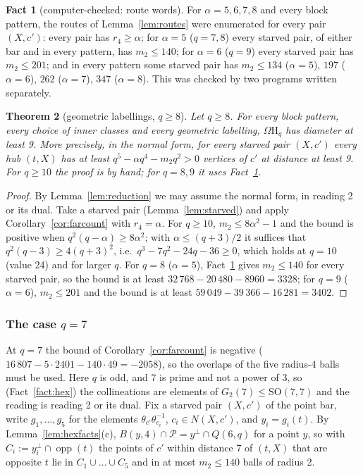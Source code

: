 \documentclass[11pt]{amsart}
\newtheorem{theorem}{Theorem}[section]
\theoremstyle{definition}
\newtheorem{fact}[theorem]{Fact}
\theoremstyle{remark}
\numberwithin{equation}{section}
\newcommand{\opp}{\operatorname{opp}}
\newcommand{\cP}{\mathcal P}
\newcommand{\Om}{\Omega\mathrm H}
\begin{document}
\begin{fact}[computer-checked: route words]\label{fact:C4}
For $\alpha=5,6,7,8$ and every block pattern, the routes of Lemma~\ref{lem:routes} were enumerated for every pair $(X,c')$:
every pair has $r_4\ge\alpha$; for $\alpha=5$ ($q=7,8$) every starved pair, of either bar and in every pattern, has $m_2\le140$;
for $\alpha=6$ ($q=9$) every starved pair has $m_2\le201$; and in every pattern some starved pair has $m_2\le134$
($\alpha=5$), $197$ ($\alpha=6$), $262$ ($\alpha=7$), $347$ ($\alpha=8$). This was checked by two programs written separately.
\end{fact}

\begin{theorem}[geometric labellings, $q\ge8$]\label{thm:geomq8}
Let $q\ge8$. For every block pattern, every choice of inner classes and every geometric labelling, $\Om_q$ has diameter at
least 9. More precisely, in the normal form, for every starved pair $(X,c')$ every hub $(t,X)$ has at least
$q^5-\alpha q^4-m_2q^2>0$ vertices of $c'$ at distance at least 9. For $q\ge10$ the proof is by hand; for $q=8,9$ it uses
Fact~\ref{fact:C4}.
\end{theorem}

\begin{proof}
By Lemma~\ref{lem:reduction} we may assume the normal form, in reading 2 or its dual. Take a starved pair
(Lemma~\ref{lem:starved}) and apply Corollary~\ref{cor:farcount} with $r_4=\alpha$. For $q\ge10$, $m_2\le8\alpha^2-1$ and the
bound is positive when $q^2(q-\alpha)\ge8\alpha^2$; with $\alpha\le(q+3)/2$ it suffices that $q^2(q-3)\ge4(q+3)^2$, i.e.\
$q^3-7q^2-24q-36\ge0$, which holds at $q=10$ (value 24) and for larger $q$. For $q=8$ ($\alpha=5$), Fact~\ref{fact:C4} gives
$m_2\le140$ for every starved pair, so the bound is at least $32\,768-20\,480-8960=3328$; for $q=9$ ($\alpha=6$), $m_2\le201$
and the bound is at least $59\,049-39\,366-16\,281=3402$.
\end{proof}

\subsubsection*{The case $q=7$}
At $q=7$ the bound of Corollary~\ref{cor:farcount} is negative ($16\,807-5\cdot2401-140\cdot49=-2058$), so the overlaps of the
five radius-4 balls must be used. Here $q$ is odd, and 7 is prime and not a power of 3, so (Fact~\ref{fact:hex}) the collineations are elements of $G_2(7)\le
\mathrm{SO}(7,7)$ and the reading is reading 2 or its dual. Fix a starved pair $(X,c')$ of the point bar, write $g_1,\dots,g_5$
for the elements $\theta_{c'}\theta_{c_i}^{-1}$, $c_i\in N(X,c')$, and $y_i=g_i(t)$. By Lemma~\ref{lem:hexfacts}(c),
$B(y,4)\cap\cP=y^\perp\cap Q(6,q)$ for a point $y$, so with $C_i:=y_i^\perp\cap\opp(t)$ the points of $c'$ within distance 7 of
$(t,X)$ that are opposite $t$ lie in $C_1\cup\dots\cup C_5$ and in at most $m_2\le140$ balls of radius 2.
\end{document}
